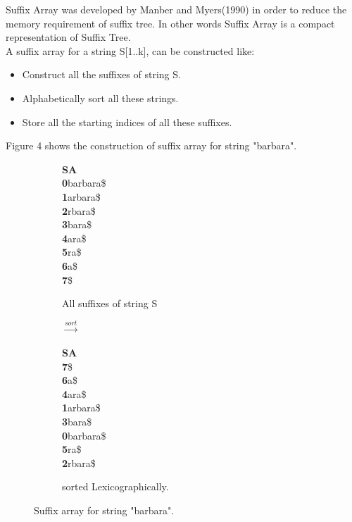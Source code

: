 \documentclass[11pt,a4paper]{report}
\begin{document}
Suffix Array was developed by Manber and Myers(1990) in order to reduce the 
memory requirement of suffix tree. In other words Suffix Array is a compact 
representation of Suffix Tree. \\
A suffix array for a string S[1..k], can be constructed like:
\begin{itemize} 
	\item  Construct all the suffixes of string S.
	\item  Alphabetically sort all these strings.
	\item Store all the starting indices of all these suffixes.
\end{itemize}
Figure 4 shows the construction of suffix array for string "barbara".
\begin{figure}[H]
\centering
\begin{subfigure}{.2\textwidth}
\textbf{SA}  \\
\enspace  \textbf{0}\quad barbara\$\\
\textbf{1}\quad arbara\$\\
\textbf{2}\quad rbara\$\\
\textbf{3}\quad  bara\$\\
\textbf{4}\quad   ara\$\\
\textbf{5}\quad     ra\$\\
\textbf{6}\quad     a\$\\
\textbf{7}\quad       \$
  \caption{All suffixes of string S}
  \label{fig:sub1}
\end{subfigure}%
\begin{subfigure}{.2\textwidth}
\textbf{$\xrightarrow{sort}$}
\label{fig:sub1}
\end{subfigure}%
\begin{subfigure}{.3\textwidth}
\textbf{SA} \\
\textbf{7}\quad \$\\
\textbf{6}\quad a\$\\
\textbf{4}\quad ara\$\\
\textbf{1}\quad arbara\$\\
\textbf{3}\quad bara\$\\
\textbf{0}\quad barbara\$\\
\textbf{5}\quad ra\$\\
\textbf{2}\quad rbara\$
 \caption{sorted  Lexicographically.}
  \label{fig:Burrows-Wheeler transform}
\end{subfigure}
\caption{Suffix array for string "barbara".}
\label{fig:test}
\end{figure}
\end{document}
